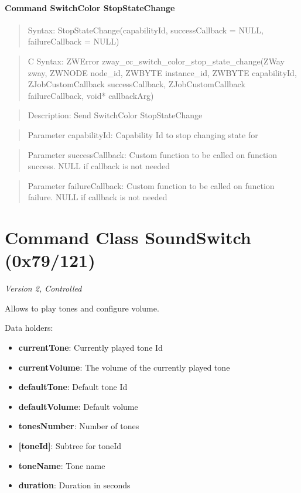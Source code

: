 \paragraph{Command SwitchColor StopStateChange}
\begin{quote}Syntax: StopStateChange(capabilityId, successCallback = NULL, failureCallback = NULL)\end{quote}
\begin{quote}C Syntax: ZWError zway\_cc\_switch\_color\_stop\_state\_change(ZWay zway, ZWNODE node\_id, ZWBYTE instance\_id, ZWBYTE capabilityId, ZJobCustomCallback successCallback, ZJobCustomCallback failureCallback, void* callbackArg)\end{quote}
\begin{quote}Description: Send SwitchColor StopStateChange\end{quote}
\begin{quote}Parameter capabilityId: Capability Id to stop changing state for\end{quote}
\begin{quote}Parameter successCallback: Custom function to be called on function success. NULL if callback is not needed\end{quote}
\begin{quote}Parameter failureCallback: Custom function to be called on function failure. NULL if callback is not needed\end{quote}



\section{Command Class SoundSwitch (0x79/121)}

\textit{Version 2, Controlled}
\newline

Allows to play tones and configure volume.
\newline

\noindent
Data holders:

\begin{itemize}
\item \textbf{currentTone}: Currently played tone Id
\item \textbf{currentVolume}: The volume of the currently played tone
\item \textbf{defaultTone}: Default tone Id
\item \textbf{defaultVolume}: Default volume
\item \textbf{tonesNumber}: Number of tones
\item \textbf{[toneId]}: Subtree for toneId
\item \qquad\textbf{toneName}: Tone name
\item \qquad\textbf{duration}: Duration in seconds
\end{itemize}

